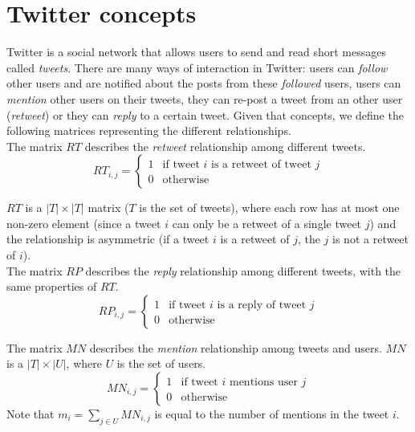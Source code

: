\documentclass[12pt,a4paper]{article}
\begin{document}
\section{Twitter concepts}
Twitter is a social network that allows users to send and read short messages called \emph{tweets}. There are many ways of interaction in Twitter: users can \emph{follow} other users and are notified about the posts from these \emph{followed} users, users can \emph{mention} other users on their tweets, they can re-post a tweet from an other user (\emph{retweet}) or they can \emph{reply} to a certain tweet. Given that concepts, we define the following matrices representing the different relationships. \\



The matrix $RT$ describes the \emph{retweet} relationship among different tweets. 
\begin{equation}
RT_{i,j} = \begin{cases}
1 & \text{if tweet } i \text{ is a retweet of tweet } j \\
0 & \text{otherwise}
\end{cases}
\end{equation}

$RT$ is a $|T| \times |T|$ matrix ($T$ is the set of tweets), where each row has at most one non-zero element (since a tweet $i$ can only be a retweet of a single tweet $j$) and the relationship is asymmetric (if a tweet $i$ is a retweet of $j$, the $j$ is not a retweet of $i$). \\

The matrix $RP$ describes the \emph{reply} relationship among different tweets, with the same properties of $RT$.
\begin{equation}
RP_{i,j} = \begin{cases}
1 & \text{if tweet } i \text{ is a reply of tweet } j \\
0 & \text{otherwise}
\end{cases}
\end{equation}

The matrix $MN$ describes the \emph{mention} relationship among tweets and users. $MN$ is a $|T| \times |U|$, where $U$ is the set of users. 
\begin{equation}\label{eq:mentions_matrix}
MN_{i,j} = \begin{cases}
1 & \text{if tweet } i \text{ mentions user } j \\
0 & \text{otherwise}
\end{cases}
\end{equation}
Note that $m_i = \sum_{j \in U} MN_{i,j}$ is equal to the number of mentions in the tweet $i$. \\
\end{document}
